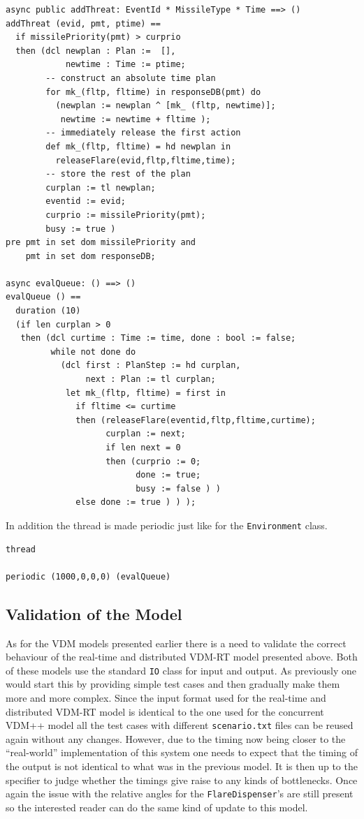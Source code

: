 \documentclass{overturerepchap}
\begin{document}
\begin{lstlisting}
async public addThreat: EventId * MissileType * Time ==> ()
addThreat (evid, pmt, ptime) ==
  if missilePriority(pmt) > curprio
  then (dcl newplan : Plan :=  [],
            newtime : Time := ptime;
        -- construct an absolute time plan
        for mk_(fltp, fltime) in responseDB(pmt) do
          (newplan := newplan ^ [mk_ (fltp, newtime)];
           newtime := newtime + fltime );
        -- immediately release the first action
        def mk_(fltp, fltime) = hd newplan in
          releaseFlare(evid,fltp,fltime,time);
        -- store the rest of the plan
        curplan := tl newplan;
        eventid := evid;
        curprio := missilePriority(pmt);
        busy := true )
pre pmt in set dom missilePriority and
    pmt in set dom responseDB;

async evalQueue: () ==> ()
evalQueue () ==
  duration (10)
  (if len curplan > 0
   then (dcl curtime : Time := time, done : bool := false;
         while not done do
           (dcl first : PlanStep := hd curplan,
                next : Plan := tl curplan;
            let mk_(fltp, fltime) = first in
              if fltime <= curtime
              then (releaseFlare(eventid,fltp,fltime,curtime);
                    curplan := next;
                    if len next = 0
                    then (curprio := 0; 
                          done := true; 
                          busy := false ) )
              else done := true ) ) );
\end{lstlisting}

In addition the thread is made periodic just like for the 
\texttt{Environment} class.

\begin{lstlisting}
thread

periodic (1000,0,0,0) (evalQueue)
\end{lstlisting}

\subsection{Validation of the Model}

As for the VDM models presented earlier there is a need to
validate the correct behaviour of the real-time and distributed 
VDM-RT model presented
above. Both of these models use the standard
\texttt{IO} class for input and output. As previously one would start 
this by providing simple test cases and then gradually make them more
and more complex. Since the input format used for the real-time and
distributed VDM-RT model is identical to the one used for the
concurrent VDM++ model all the test cases with different
\texttt{scenario.txt} files can be reused again without any changes.
However, due to the timing now being closer to the ``real-world''
implementation of this system one needs to expect that the timing of
the output is not identical to what was in the previous model. It is
then up to the specifier to judge whether the timings give raise to
any kinds of bottlenecks. Once again the issue with the relative
angles for the
\texttt{FlareDispenser}'s are still present so the interested reader
can do the same kind of update to this model.
\end{document}
